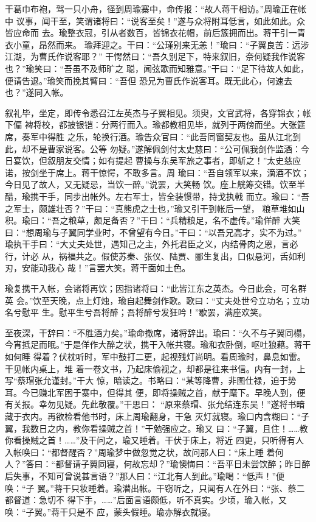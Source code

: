 干葛巾布袍，驾一只小舟，径到周瑜寨中，命传报：“故人蒋干相访。”周瑜正在帐中
议事，闻干至，笑谓诸将曰：“说客至矣！”遂与众将附耳低言，如此如此。众皆应命而
去。瑜整衣冠，引从者数百，皆锦衣花帽，前后簇拥而出。蒋干引一青衣小童，昂然而来。
瑜拜迎之。干曰：“公瑾别来无恙！”瑜曰：“子翼良苦：远涉江湖，为曹氏作说客耶？”
干愕然曰：“吾久别足下，特来叙旧，奈何疑我作说客也？”瑜笑曰：“吾虽不及师旷之
聪，闻弦歌而知雅意。”干曰：“足下待故人如此，便请告退。”瑜笑而挽其臂曰：“吾但
恐兄为曹氏作说客耳。既无此心，何速去也？”遂同入帐。

叙礼毕，坐定，即传令悉召江左英杰与子翼相见。须臾，文官武将，各穿锦衣；帐下偏
裨将校，都披银铠：分两行而入。瑜都教相见毕，就列于两傍而坐。大张筵席，奏军中得胜
之乐，轮换行酒。瑜告众官曰：“此吾同窗契友也。虽从江北到此，却不是曹家说客。公等
勿疑。”遂解佩剑付太史慈曰：“公可佩我剑作监酒：今日宴饮，但叙朋友交情；如有提起
曹操与东吴军旅之事者，即斩之！”太史慈应诺，按剑坐于席上。蒋干惊愕，不敢多言。周
瑜曰：“吾自领军以来，滴酒不饮；今日见了故人，又无疑忌，当饮一醉。”说罢，大笑畅
饮。座上觥筹交错。饮至半醋，瑜携干手，同步出帐外。左右军士，皆全装惯带，持戈执戟
而立。瑜曰：“吾之军士，颇雄壮否？”干曰：“真熊虎之士也，”瑜又引干到帐后一望，
粮草堆如山积。瑜曰：“吾之粮草，颇足备否？”干曰：“兵精粮足，名不虚传。”瑜佯醉
大笑曰：“想周瑜与子翼同学业时，不曾望有今日。”干曰：“以吾兄高才，实不为过。”
瑜执干手曰：“大丈夫处世，遇知己之主，外托君臣之义，内结骨肉之恩，言必行，计必
从，祸福共之。假使苏秦、张仪、陆贾、郦生复出，口似悬河，舌如利刃，安能动我心
哉！”言罢大笑。蒋干面如土色。

瑜复携干入帐，会诸将再饮；因指诸将曰：“此皆江东之英杰。今日此会，可名群英
会。”饮至天晚，点上灯烛，瑜自起舞剑作歌。歌曰：“丈夫处世兮立功名；立功名兮慰平
生。慰平生兮吾将醉；吾将醉兮发狂吟！”歇罢，满座欢笑。

至夜深，干辞曰：“不胜酒力矣。”瑜命撤席，诸将辞出。瑜曰：“久不与子翼同榻，
今宵抵足而眠。”于是佯作大醉之状，携干入帐共寝。瑜和衣卧倒，呕吐狼藉。蒋干如何睡
得着？伏枕听时，军中鼓打二更，起视残灯尚明。看周瑜时，鼻息如雷。干见帐内桌上，堆
着一卷文书，乃起床偷视之，却都是往来书信。内有一封，上写“蔡瑁张允谨封。”干大
惊，暗读之。书略曰：“某等降曹，非图仕禄，迫于势耳。今已赚北军困于寨中，但得其
便，即将操贼之首，献于麾下。早晚人到，便有关报。幸勿见疑。先此敬覆。”干思曰：
“原来蔡瑁、张允结连东吴！”遂将书暗藏于衣内。再欲检看他书时，床上周瑜翻身，干急
灭灯就寝。瑜口内含糊曰：“子翼，我数日之内，教你看操贼之首！”干勉强应之。瑜又
曰：“子翼，且住！……教你看操贼之首！……”及干问之，瑜又睡着。干伏于床上，将近
四更，只听得有人入帐唤曰：“都督醒否？”周瑜梦中做忽觉之状，故问那人曰：“床上睡
着何人？”答曰：“都督请子翼同寝，何故忘却？”瑜懊悔曰：“吾平日未尝饮醉；昨日醉
后失事，不知可曾说甚言语？”那人曰：“江北有人到此。”瑜喝：“低声！”便唤：“子
翼。”蒋干只妆睡着。瑜潜出帐。干窃听之，只闻有人在外曰：“张、蔡二都督道：急切不
得下手，……”后面言语颇低，听不真实。少顷，瑜入帐，又唤：“子翼。”蒋干只是不
应，蒙头假睡。瑜亦解衣就寝。


